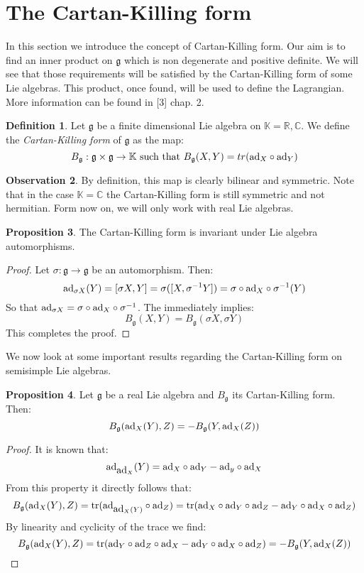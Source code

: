 \documentclass[12pt,a4paper]{report}
\theoremstyle{definition}
\newtheorem{Def}{Definition}[chapter]
\theoremstyle{Theorem}
\newtheorem{Prop}[Def]{Proposition}
\theoremstyle{definition}
\theoremstyle{definition}
\newtheorem{Obs}[Def]{Observation}
\begin{document}
	\section{The Cartan-Killing form}
	In this section we introduce the concept of Cartan-Killing form. Our aim is to find an inner product on $\mathfrak{g}$ which is non degenerate and positive definite. We will see that those requirements will be satisfied by the Cartan-Killing form of some Lie algebras. This product, once found, will be used to define the Lagrangian. More information can be found in [3] chap. 2.
	\begin{Def}
		Let $\mathfrak{g}$ be a finite dimensional Lie algebra on $\mathbb{K}=\mathbb{R},\mathbb{C}$. We define the \textit{Cartan-Killing form} of $\mathfrak{g}$ as the map:
		$$B_\mathfrak{g}:\mathfrak{g}\times \mathfrak{g}\rightarrow\mathbb{K}\hbox{ such that } B_\mathfrak{g}(X,Y)=tr(\hbox{ad}_X\circ \hbox{ad}_Y)$$
	\end{Def}
	\begin{Obs}
		By definition, this map is clearly bilinear and symmetric. Note that in the case $\mathbb{K}=\mathbb{C}$ the Cartan-Killing form is still symmetric and not hermitian. Form now on, we will only work with real Lie algebras.
	\end{Obs} 
	\begin{Prop}\label{Prop_2.8.2}
		The Cartan-Killing form is invariant under Lie algebra automorphisms.
	\end{Prop}
	\begin{proof}
		Let $\sigma:\mathfrak{g}\rightarrow\mathfrak{g}$ be an automorphism. Then:
		$$\hbox{ad}_{\sigma X}(Y)=[\sigma X,Y]=\sigma([X,\sigma^{-1}Y])=\sigma\circ \hbox{ad}_X\circ \sigma^{-1}(Y)$$
		So that $\hbox{ad}_{\sigma X}=\sigma\circ \hbox{ad}_X\circ \sigma^{-1}$. The immediately implies:
		$$B_\mathfrak{g}(X,Y)=B_\mathfrak{g}(\sigma X,\sigma Y)$$
		This completes the proof.
	\end{proof}
	We now look at some important results regarding the Cartan-Killing form on semisimple Lie algebras.
	\begin{Prop}
		Let $\mathfrak{g}$ be a real Lie algebra and $B_\mathfrak{g}$ its Cartan-Killing form. Then:
		$$B_\mathfrak{g}(\hbox{ad}_X(Y),Z)=-B_\mathfrak{g}(Y,\hbox{ad}_X(Z))$$
	\end{Prop}
	\begin{proof}
		It is known that:
		$$\hbox{ad}_{\hbox{ad}_X}(Y)=\hbox{ad}_X\circ \hbox{ad}_Y-\hbox{ad}_y\circ \hbox{ad}_X$$
		From this property it directly follows that:
		$$B_\mathfrak{g}(\hbox{ad}_X(Y),Z)=\hbox{tr}(\hbox{ad}_{\hbox{ad}_X(Y)}\circ \hbox{ad}_Z)=\hbox{tr}(\hbox{ad}_X\circ \hbox{ad}_Y\circ \hbox{ad}_Z-\hbox{ad}_Y\circ\hbox{ad}_X\circ \hbox{ad}_Z)$$
		By linearity and cyclicity of the trace we find:
		$$B_\mathfrak{g}(\hbox{ad}_X(Y),Z)=\hbox{tr}(\hbox{ad}_Y\circ \hbox{ad}_Z\circ \hbox{ad}_X-\hbox{ad}_Y\circ\hbox{ad}_X\circ \hbox{ad}_Z)=-B_\mathfrak{g}(Y,\hbox{ad}_X(Z))$$
	\end{proof}
\end{document}
